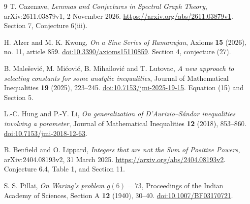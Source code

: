 \documentclass[11pt,a4paper]{article}
\numberwithin{equation}{section}
\theoremstyle{remark}
\begin{document}
{}
\begin{thebibliography}{9}
T. Cazenave,
\emph{Lemmas and Conjectures in Spectral Graph Theory},
arXiv:2611.03879v1, 2 November 2026.
\url{https://arxiv.org/abs/2611.03879v1}.
Section 7, Conjecture 6(iii).

H. Alzer and M. K. Kwong,
\emph{On a Sine Series of Ramanujan},
Axioms \textbf{15} (2026), no. 11, article 859.
\href{https://doi.org/10.3390/axioms15110859}{doi:10.3390/axioms15110859}.
Section 4, conjecture (27).

B. Male\v sevi\'c, M. Mi\'covi\'c, B. Mihailovi\'c and T. Lutovac,
\emph{A new approach to selecting constants for some analytic inequalities},
Journal of Mathematical Inequalities \textbf{19} (2025), 223--245.
\href{https://doi.org/10.7153/jmi-2025-19-15}{doi:10.7153/jmi-2025-19-15}.
Equation (15) and Section 5.

L.-C. Hung and P.-Y. Li,
\emph{On generalization of D'Aurizio--S\'andor inequalities involving a parameter},
Journal of Mathematical Inequalities \textbf{12} (2018), 853--860.
\href{https://doi.org/10.7153/jmi-2018-12-63}{doi:10.7153/jmi-2018-12-63}.

B. Benfield and O. Lippard,
\emph{Integers that are not the Sum of Positive Powers},
arXiv:2404.08193v2, 31 March 2025.
\url{https://arxiv.org/abs/2404.08193v2}.
Conjecture 6.4, Table 1, and Section 11.

S. S. Pillai,
\emph{On Waring's problem $g(6)=73$},
Proceedings of the Indian Academy of Sciences, Section A
\textbf{12} (1940), 30--40.
\href{https://doi.org/10.1007/BF03170721}{doi:10.1007/BF03170721}.
\end{thebibliography}
\end{document}
